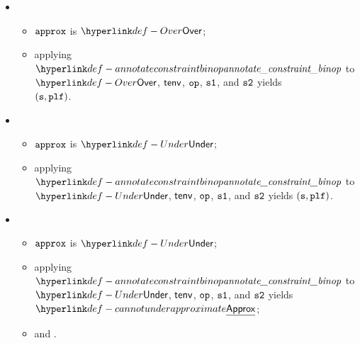 \ProseParagraph
\OneApplies
\begin{itemize}
  \item {}
  \begin{itemize}
    \item $\vapprox$ is $\Over$;
    \item applying $\annotateconstraintbinop$ to $\Over$, $\tenv$, $\op$, $\vsone$, and $\vstwo$
          yields \\
          $(\vs, \plf)$\ProseTerminateAs{\CannotOverapproximate}.
  \end{itemize}

  \item {}
  \begin{itemize}
    \item $\vapprox$ is $\Under$;
    \item applying $\annotateconstraintbinop$ to $\Under$, $\tenv$, $\op$, $\vsone$, and $\vstwo$
          yields $(\vs, \plf)$\ProseTerminateAs{\CannotOverapproximate}.
  \end{itemize}

  \item {}
  \begin{itemize}
    \item $\vapprox$ is $\Under$;
    \item applying $\annotateconstraintbinop$ to $\Under$, $\tenv$, $\op$, $\vsone$, and $\vstwo$
          yields $\CannotUnderapproximate$;
    \item {} and \Proseeqdef{$\plf$}{$\PrecisionLost$}.
  \end{itemize}
\end{itemize}

\FormallyParagraph
\begin{mathpar}
\end{mathpar}

\begin{mathpar}
\end{mathpar}

